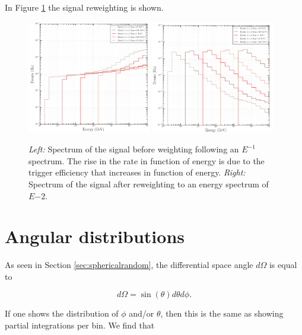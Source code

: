 \begin{appendices}
In Figure \ref{fig:signalweighting} the signal reweighting is shown.

\begin{figure}
\centering
\includegraphics[width=0.48\textwidth]{appendix/img/SpectrumBeforeWeighting.png}
\includegraphics[width=0.48\textwidth]{appendix/img/SpectrumAfterWeighting.png}
\caption{\textit{Left: }Spectrum of the signal before weighting following an $E^{-1}$ spectrum. The rise in the rate in function of energy is due to the trigger efficiency that increases in function of energy. \textit{Right: }Spectrum of the signal after reweighting to an energy spectrum of $E{-2}$.}
\label{fig:signalweighting}
\end{figure}

\section{Angular distributions}
\label{sec:angularappendix}
As seen in Section \ref{sec:sphericalrandom}, the differential space angle $d\Omega$ is equal to

\begin{equation}
d\Omega = \sin(\theta) d\theta d\phi.
\end{equation} 

\noindent If one shows the distribution of $\phi$ and/or $\theta$, then this is the same as showing partial integrations per bin. We find that


\end{appendices}
